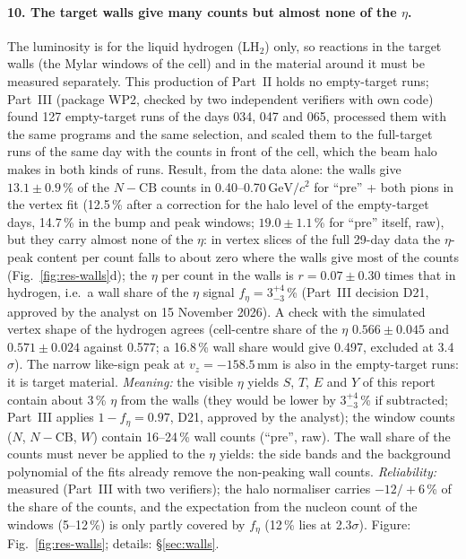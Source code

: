 \documentclass[11pt,a4paper]{article}
\newcommand{\GeVcc}{\ensuremath{\mathrm{GeV}/c^{2}}\xspace}
\newcommand{\vz}{\ensuremath{v_z}\xspace}
\begin{document}
\paragraph{10. The target walls give many counts but almost none of the $\eta$.} The luminosity is for the liquid hydrogen (LH$_2$) only, so
reactions in the target walls (the Mylar windows of the cell) and in the material around it must be measured separately. This production of
Part~II holds no empty-target runs; Part~III (package WP2, checked by two independent verifiers with own code) found 127 empty-target runs
of the days 034, 047 and 065, processed them with the same programs and the same selection, and scaled them to the full-target runs of the
same day with the counts in front of the cell, which the beam halo makes in both kinds of runs. Result, from the data alone: the walls give
$13.1\pm0.9$\,\% of the $N-\mathrm{CB}$ counts in 0.40--0.70\,\GeVcc for ``pre'' + both pions in the vertex fit (12.5\,\% after a correction
for the halo level of the empty-target days, 14.7\,\% in the bump and peak windows; $19.0\pm1.1$\,\% for ``pre'' itself, raw), but they
carry almost none of the $\eta$:
in vertex slices of the full 29-day data the $\eta$-peak content per count falls to about zero where the walls give most of the counts
(Fig.~\ref{fig:res-walls}d); the $\eta$ per count in the walls is $r=0.07\pm0.30$ times that in hydrogen, i.e.\ a wall share of the $\eta$
signal $f_\eta=3^{+4}_{-3}$\,\% (Part~III decision D21, approved by the analyst on 15 November 2026). A check with the simulated vertex shape of the hydrogen agrees (cell-centre share of
the $\eta$ $0.566\pm0.045$ and $0.571\pm0.024$ against 0.577; a 16.8\,\% wall share would give 0.497, excluded at 3.4$\sigma$). The narrow
like-sign peak at $\vz=-158.5$\,mm is also in the empty-target runs: it is target material. \emph{Meaning:} the visible $\eta$ yields $S$,
$T$, $E$ and $Y$ of this report contain about 3\,\% $\eta$ from the walls (they would be lower by $3^{+4}_{-3}$\,\% if subtracted; Part~III
applies $1-f_\eta=0.97$, D21, approved by the analyst); the window counts ($N$, $N-\mathrm{CB}$, $W$) contain 16--24\,\% wall counts (``pre'', raw). The wall share of the
counts must never be applied to the $\eta$ yields: the side bands and the background polynomial of the fits already remove the non-peaking
wall counts. \emph{Reliability:} measured (Part~III with two verifiers); the halo normaliser carries $-12/+6$\,\% of the share of the counts, and the
expectation from the nucleon count of the windows (5--12\,\%) is only partly covered by $f_\eta$ (12\,\% lies at 2.3$\sigma$). Figure:
Fig.~\ref{fig:res-walls}; details: \S\ref{sec:walls}.
\end{document}
